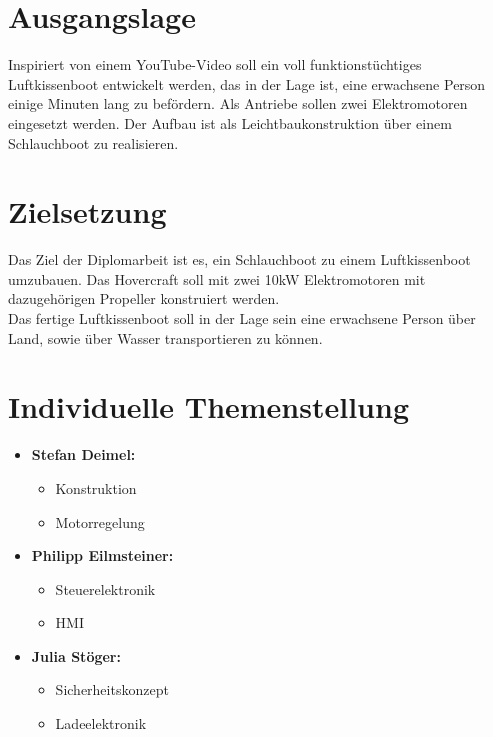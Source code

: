 \section{Ausgangslage}
Inspiriert von einem YouTube-Video\textsuperscript{\cite{YoutubeVideo}} soll ein voll funktionstüchtiges Luftkissenboot entwickelt werden, das in der Lage ist, eine erwachsene Person einige Minuten lang zu befördern. Als Antriebe sollen zwei Elektromotoren eingesetzt werden. Der Aufbau ist als Leichtbaukonstruktion über einem Schlauchboot zu realisieren.


\section{Zielsetzung}
Das Ziel der Diplomarbeit ist es, ein Schlauchboot zu einem Luftkissenboot umzubauen. Das Hovercraft soll mit zwei 10kW Elektromotoren mit dazugehörigen Propeller konstruiert werden.\\
Das fertige Luftkissenboot soll in der Lage sein eine erwachsene Person über Land, sowie über Wasser transportieren zu können.


\section{Individuelle Themenstellung}
\begin{itemize}
    \item \textbf{Stefan Deimel:}
    \begin{itemize}
      \item Konstruktion
      \item Motorregelung
    \end{itemize}
    \item \textbf{Philipp Eilmsteiner:}
    \begin{itemize}
      \item Steuerelektronik
      \item HMI
    \end{itemize}
    \item \textbf{Julia Stöger:}
    \begin{itemize}
      \item Sicherheitskonzept
      \item Ladeelektronik
    \end{itemize}
\end{itemize}



